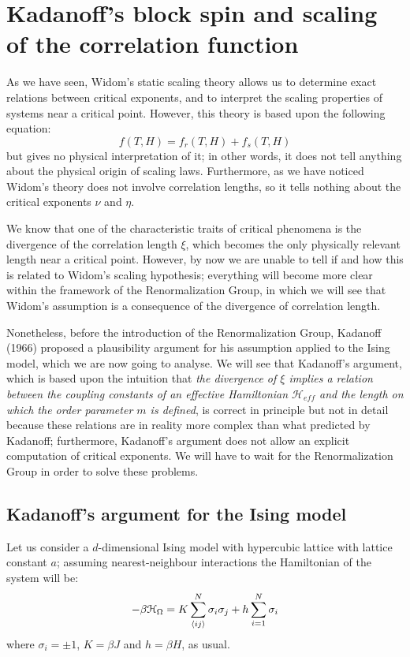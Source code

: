 \documentclass[../../Main/Main.tex]{subfiles}
\begin{document}
\section{Kadanoff's block spin and scaling of the correlation function}
As we have seen, Widom's static scaling theory allows us to determine exact relations between critical exponents, and to interpret the scaling properties of systems near a critical point. However, this theory is based upon the following equation:
\begin{equation*}
  f (T,H) = f_r (T,H) + f_s(T,H)
\end{equation*}
but gives no physical interpretation of it; in other words, it does not tell anything about the physical origin of scaling laws. Furthermore, as we have noticed Widom's theory does not involve correlation lengths, so it tells nothing about the critical exponents \( \nu  \)  and \( \eta  \).


We know that one of the characteristic traits of critical phenomena is the divergence of the correlation length \( \xi  \), which becomes the only physically relevant length near a critical point. However, by now we are unable to tell if and how this is related to Widom's scaling hypothesis; everything will become more clear within the framework of the Renormalization Group, in which we will see that Widom's assumption is a consequence of the divergence of correlation length.

Nonetheless, before the introduction of the Renormalization Group, Kadanoff (1966) proposed a plausibility argument for his assumption applied to the Ising model, which we are now going to analyse. We will see that Kadanoff's argument, which is based upon the intuition that \emph{the divergence of \( \xi  \)  implies a relation between the coupling constants of an effective Hamiltonian \( \mathcal{H}_{eff} \) and the length on which the order parameter \( m \) is defined}, is correct in principle but not in detail because these relations are in reality more complex than what predicted by Kadanoff; furthermore, Kadanoff's argument does not allow an explicit computation of critical exponents. We will have to wait for the Renormalization Group in order to solve these problems.


\subsection{Kadanoff's argument for the Ising model}
Let us consider a \( d \)-dimensional  Ising model with hypercubic lattice with lattice constant \( a \); assuming nearest-neighbour interactions the Hamiltonian of the system will be:
\begin{equation}
  - \beta \mathcal{H}_{\Omega } = K \sum_{\expval{ij}}^{N} \sigma _i \sigma _j + h \sum_{i=1}^{N} \sigma _i
\end{equation}
where \( \sigma _i = \pm 1 \), \( K=\beta J \) and \( h=\beta H \), as usual.
\end{document}
